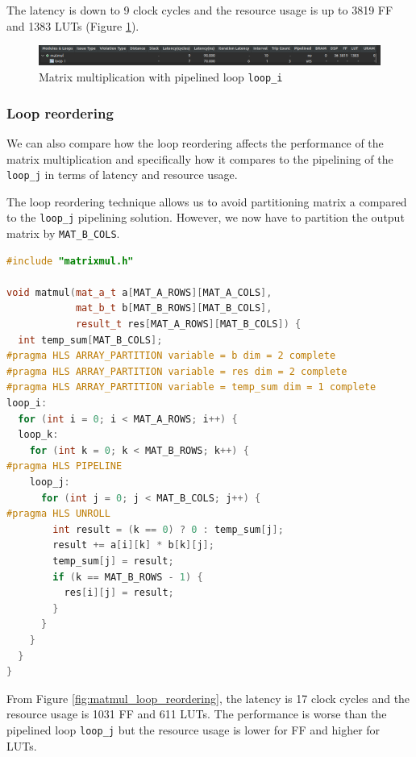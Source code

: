 \documentclass[a4paper, twoside]{report}
\theoremstyle{definition}
\numberwithin{equation}{section}
\begin{document}
The latency is down to 9 clock cycles and the resource usage is up to 3819 FF and 1383 LUTs
(Figure \ref{fig:matmul_pipei_synth}).

\begin{figure}[h!]
    \centering
    \includegraphics[width=\textwidth]{matmul_pipei_synth.png}
    \caption{Matrix multiplication with pipelined loop \texttt{loop\_i}}
    \label{fig:matmul_pipei_synth}
\end{figure}

\subsubsection{Loop reordering} \label{sec:mm_loop_reordering}


We can also compare how the loop reordering affects the performance of the matrix multiplication
and specifically how it compares to the pipelining of the \texttt{loop\_j} in terms of latency and resource usage.

The loop reordering technique allows us to avoid partitioning matrix a compared to the \texttt{loop\_j} pipelining solution. However,
we now have to partition the output matrix by \texttt{MAT\_B\_COLS}.

\begin{lstlisting}[language=c++,numbers=none]
#include "matrixmul.h"

void matmul(mat_a_t a[MAT_A_ROWS][MAT_A_COLS],
            mat_b_t b[MAT_B_ROWS][MAT_B_COLS],
            result_t res[MAT_A_ROWS][MAT_B_COLS]) {
  int temp_sum[MAT_B_COLS];
#pragma HLS ARRAY_PARTITION variable = b dim = 2 complete
#pragma HLS ARRAY_PARTITION variable = res dim = 2 complete
#pragma HLS ARRAY_PARTITION variable = temp_sum dim = 1 complete
loop_i:
  for (int i = 0; i < MAT_A_ROWS; i++) {
  loop_k:
    for (int k = 0; k < MAT_B_ROWS; k++) {
#pragma HLS PIPELINE
    loop_j:
      for (int j = 0; j < MAT_B_COLS; j++) {
#pragma HLS UNROLL
        int result = (k == 0) ? 0 : temp_sum[j];
        result += a[i][k] * b[k][j];
        temp_sum[j] = result;
        if (k == MAT_B_ROWS - 1) {
          res[i][j] = result;
        }
      }
    }
  }
}
\end{lstlisting}

From Figure \ref{fig:matmul_loop_reordering}, the latency is 17 clock cycles
and the resource usage is 1031 FF and 611 LUTs.
The performance is worse than the pipelined loop \texttt{loop\_j} but the resource usage is lower for FF and higher for LUTs.
\end{document}
